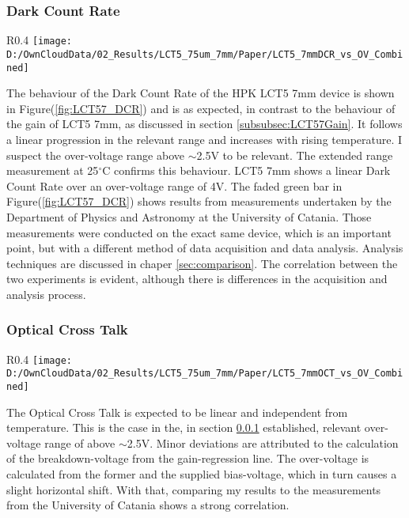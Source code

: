 \documentclass[12pt,article,type=msc,colorback,accentcolor=tud9c]{tudthesis}
\begin{document}
\subsubsection{Dark Count Rate}
\label{subsubsec:LCT57DCR}
\begin{wrapfigure}{R}{0.4\textwidth}
\centering
\texttt{[image: D:/OwnCloudData/02\_Results/LCT5\_75um\_7mm/Paper/LCT5\_7mmDCR\_vs\_OV\_Combined]}
\caption[LCT5 7mm DCR]{\label{fig:LCT57_DCR}Dark Count Rate of the HPK LCT5 7mm pixel}
\end{wrapfigure}
The behaviour of the Dark Count Rate of the HPK LCT5 7mm device is shown in Figure(\ref{fig:LCT57_DCR}) and is as expected, in contrast to the behaviour of the gain of LCT5 7mm, as discussed in section {\ref{subsubsec:LCT57Gain}}. It follows a linear progression in the relevant range and increases with rising temperature. I suspect the over-voltage range above $\sim$2.5V to be relevant. The extended range measurement at 25$^\circ$C confirms this behaviour. LCT5 7mm shows a linear Dark Count Rate over an over-voltage range of 4V. The faded green bar in Figure(\ref{fig:LCT57_DCR}) shows results from measurements undertaken by the Department of Physics and Astronomy at the University of Catania. Those measurements were conducted on the exact same device, which is an important point, but with a different method of data acquisition and data analysis. Analysis techniques are discussed in chaper {\ref{sec:comparison}}. The correlation between the two experiments is evident, although there is differences in the acquisition and analysis process.


\subsubsection{Optical Cross Talk}
\begin{wrapfigure}{R}{0.4\textwidth}
\centering
\texttt{[image: D:/OwnCloudData/02\_Results/LCT5\_75um\_7mm/Paper/LCT5\_7mmOCT\_vs\_OV\_Combined]}
\caption[LCT5 7mm OCT]{\label{fig:LCT57_OCT}Dark Count Rate of the HPK LCT5 7mm pixel}
\end{wrapfigure}

The Optical Cross Talk is expected to be linear and independent from temperature. This is the case in the, in section {\ref{subsubsec:LCT57DCR}} established, relevant over-voltage range of above $\sim$2.5V. Minor deviations are attributed to the calculation of the breakdown-voltage from the gain-regression line. The over-voltage is calculated from the former and the supplied bias-voltage, which in turn causes a slight horizontal shift. With that, comparing my results to the measurements from the University of Catania shows a strong correlation.
\end{document}
